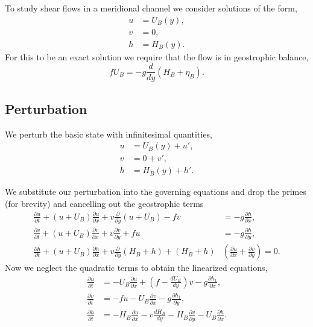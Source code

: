 \documentclass[11pt]{article}
\begin{document}
To study shear flows in a meridional channel we consider solutions of the form,
\begin{align*}
u & = U_B(y), \\
v & = 0,\\
h & = H_B(y).
\end{align*}
For this to be an exact solution we require that the flow is in geostrophic balance,
$$
f U_B = - g \frac{d}{dy}\left( H_B + \eta_B \right).
$$
\subsection*{Perturbation}

We perturb the basic state with infinitesimal quantities,
\begin{align*}
u & = U_B(y) + u', \\
v & = 0     + v',\\
h & = H_B(y) + h'.
\end{align*}

We substitute our perturbation into the governing equations and drop the primes (for brevity) and cancelling out the geostrophic terms 
\begin{align*}
\frac{\partial u}{\partial t} + (u + U_B) \frac{\partial u}{\partial x} + v \frac{\partial}{\partial y} \left(u + U_B \right)  - f v & = - g \frac{\partial h}{\partial x}, \\
 \frac{\partial v}{\partial t}   + (u + U_B) \frac{\partial v}{\partial x} + v \frac{\partial v }{\partial y} + f u 
 & = - g \frac{\partial h}{\partial y}, \\
\frac{\partial h}{\partial t}  + (u + U_B) \frac{\partial h}{\partial x}   + v \frac{\partial}{\partial y}(H_B + h)
+ (H_B + h)  & \left( \frac{\partial u}{\partial x} + \frac{\partial v}{\partial y} \right) =  0.
\end{align*}
Now we neglect the quadratic terms to obtain the linearized equations,
\begin{align*}
\frac{\partial u}{\partial t}
& = - U_B \frac{\partial u}{\partial x} + \left( f - \frac{d U_B}{d y}  \right) v  - g \frac{\partial h_1}{\partial x}, \\
 \frac{\partial v}{\partial t}    & =  - f u  - U_B \frac{\partial v}{\partial x}  - g \frac{\partial h_1}{\partial y}, \\
\frac{\partial h}{\partial t}   & = - H_B \frac{\partial u}{\partial x}    - v \frac{d H_B}{d y}
 - H_B \frac{\partial v}{\partial y} - U_B \frac{\partial h}{\partial x} .
\end{align*}
\end{document}
